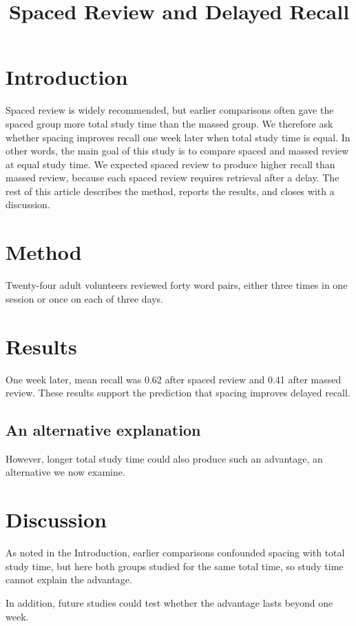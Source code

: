 \documentclass{article}
\title{Spaced Review and Delayed Recall}
\begin{document}
\maketitle

\section{Introduction}\label{sec:introduction}
Spaced review is widely recommended, but earlier comparisons often gave the spaced group more total study time than the massed group.
We therefore ask whether spacing improves recall one week later when total study time is equal.
In other words, the main goal of this study is to compare spaced and massed review at equal study time.
We expected spaced review to produce higher recall than massed review,
because each spaced review requires retrieval after a delay.
The rest of this article describes the method, reports the results, and closes with a discussion.

\section{Method}\label{sec:method}
Twenty-four adult volunteers reviewed forty word pairs, either three times in one session or once on each of three days.

\section{Results}\label{sec:results}
One week later, mean recall was 0.62 after spaced review and 0.41 after massed review.
These results support the prediction that spacing improves delayed recall.

\subsection{An alternative explanation}\label{sec:alternative}
However, longer total study time could also produce such an advantage, an alternative we now examine.

\section{Discussion}\label{sec:discussion}
As noted in the Introduction, earlier comparisons confounded spacing with total study time, but here both groups studied for the same total time, so study time cannot explain the advantage.

In addition, future studies could test whether the advantage lasts beyond one week.
\end{document}
